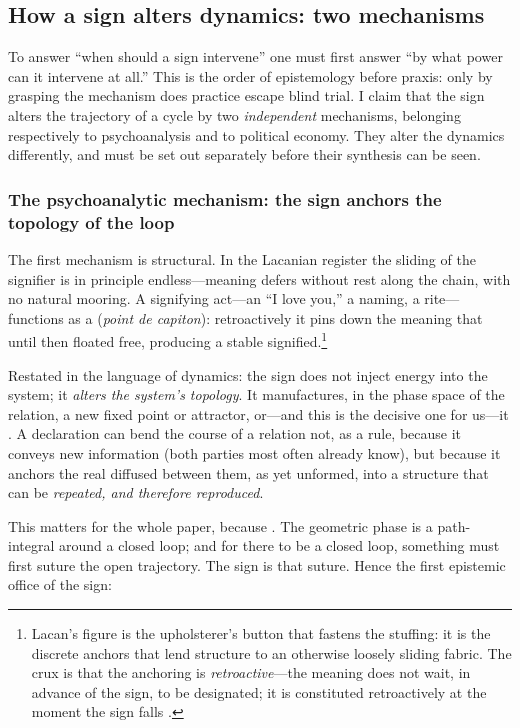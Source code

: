 \subsection{How a sign alters dynamics: two mechanisms}
\label{p09:sec:two-mechanisms}

To answer ``when should a sign intervene'' one must first answer ``by what power can it intervene at all.'' This is the order of epistemology before praxis: only by grasping the mechanism does practice escape blind trial. I claim that the sign alters the trajectory of a cycle by two \emph{independent} mechanisms, belonging respectively to psychoanalysis and to political economy. They alter the dynamics differently, and must be set out separately before their synthesis can be seen.

\subsubsection{The psychoanalytic mechanism: the sign anchors the topology of the loop}

The first mechanism is structural. In the Lacanian register the sliding of the signifier is in principle endless---meaning defers without rest along the chain, with no natural mooring. A signifying act---an ``I love you,'' a naming, a rite---functions as a  (\emph{point de capiton}): retroactively it pins down the meaning that until then floated free, producing a stable signified.\footnote{Lacan's figure is the upholsterer's button that fastens the stuffing: it is the discrete anchors that lend structure to an otherwise loosely sliding fabric. The crux is that the anchoring is \emph{retroactive}---the meaning does not wait, in advance of the sign, to be designated; it is constituted retroactively at the moment the sign falls \parencite{lacan2006}.} 

Restated in the language of dynamics: the sign does not inject energy into the system; it \emph{alters the system's topology}. It manufactures, in the phase space of the relation, a new fixed point or attractor, or---and this is the decisive one for us---it . A declaration can bend the course of a relation not, as a rule, because it conveys new information (both parties most often already know), but because it anchors the real diffused between them, as yet unformed, into a structure that can be \emph{repeated, and therefore reproduced}.

This matters for the whole paper, because . The geometric phase is a path-integral around a closed loop; and for there to be a closed loop, something must first suture the open trajectory. The sign is that suture. Hence the first epistemic office of the sign:

